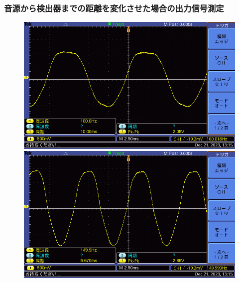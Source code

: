 \documentclass{ltjsarticle}
\begin{document}
		\subsubsection{音源から検出器までの距離を変化させた場合の出力信号測定}
			\begin{figure}[H]
			\centering
			\begin{minipage}{0.4\columnwidth}
			\centering
			\includegraphics[width = \columnwidth]{figs/F0026TEK.PNG}
			\end{minipage}
			\hspace{0.04\columnwidth}
			\begin{minipage}{0.4\columnwidth}
			\centering
			\includegraphics[width = \columnwidth]{figs/F0027TEK.PNG}
			\end{minipage}
			\hspace{0.04\columnwidth}
			\begin{minipage}{0.4\columnwidth}
			\centering

\end{minipage}
\end{figure}
\end{document}
